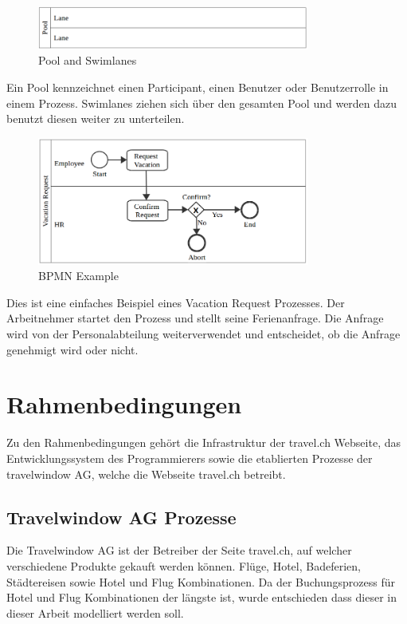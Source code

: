 \begin{figure}[H]
	\centering
	\includegraphics[width=0.8\textwidth]{images/bpmn-pool-swimlanes.png}
	\caption{Pool and Swimlanes}
	\label{fig:recherche:bpmn:poolswimlanes}
\end{figure}
Ein Pool kennzeichnet einen Participant, einen Benutzer oder Benutzerrolle in einem Prozess. Swimlanes ziehen sich über den gesamten Pool und werden dazu benutzt diesen weiter zu unterteilen.

\begin{figure}[H]
	\centering
	\includegraphics[width=0.8\textwidth]{images/bpmn-example.png}
	\caption{BPMN Example}
	\label{fig:recherche:bpmn:example}
\end{figure}
Dies ist eine einfaches Beispiel eines Vacation Request Prozesses. Der Arbeitnehmer startet den Prozess und stellt seine Ferienanfrage. Die Anfrage wird von der Personalabteilung weiterverwendet und entscheidet, ob die Anfrage genehmigt wird oder nicht.

\section{Rahmenbedingungen}
Zu den Rahmenbedingungen gehört die Infrastruktur der travel.ch Webseite, das Entwicklungssystem des Programmierers sowie die etablierten Prozesse der travelwindow AG, welche die Webseite travel.ch betreibt.

\subsection{Travelwindow AG Prozesse}
\label{sec:Recherche:rahmenbedingungen:prozesse}
Die Travelwindow AG ist der Betreiber der Seite travel.ch, auf welcher verschiedene Produkte gekauft werden können. Flüge, Hotel, Badeferien, Städtereisen sowie Hotel und Flug Kombinationen. Da der Buchungsprozess für Hotel und Flug Kombinationen der längste ist, wurde entschieden dass dieser in dieser Arbeit modelliert werden soll. 

